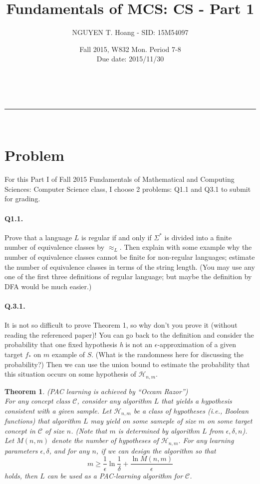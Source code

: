 \documentclass[a4paper,12pt]{article}
\makeatletter
\newcommand{\linia}{\rule{\linewidth}{0.5pt}}
\renewcommand{\maketitle} {
\begin{center}
\vspace{2ex}
{\huge \textsc{\@title}}
\vspace{1ex}
\\
\linia\\
\@author \hfill \@date
\vspace{4ex}
\end{center}
}
\newtheorem{theorem}{Theorem}
\makeatother
\begin{document}

\title{Fundamentals of MCS: CS - Part 1}

\author{NGUYEN T. Hoang - SID: 15M54097}

\date{Fall 2015, W832 Mon. Period 7-8 \\ \hfill Due date: 2015/11/30}

\maketitle

\vfill
\section*{Problem}
\noindent
For this Part I of Fall 2015 Fundamentals of Mathematical and Computing Sciences: Computer Science class, I choose 2 problems: Q1.1 and Q3.1 to submit for grading.

\paragraph{Q1.1.} Prove that a language $L$ is regular if and only if $\Sigma^{*}$ is divided into a finite number of equivalence classes by $\approx_{L}$. Then explain with some example why the number of equivalence classes cannot be finite for non-regular languages; estimate the number of equivalence classes in terms of the string length. (You may use any one of the first three definitions of regular language; but maybe the definition by DFA would be much easier.)

\paragraph{Q.3.1.} It is not so difficult to prove Theorem 1, so why don't you prove it (without reading the referenced paper)! You can go back to the definition and consider the probability that one fixed hypothesis \emph{h} is not an $\epsilon$-approximation of a given target $f_{*}$ on $m$ example of $S$. (What is the randomness here for discussing the probability?) Then we can use the union bound to estimate the probability that this situation occurs on some hypothesis of $\mathcal{H}_{n,m}$.
\begin{theorem}
    (PAC learning is achieved by ``Occam Razor'') \\
    For any concept class $\mathcal{C}$, consider any algorithm $L$ that yields a hypothesis consistent with a given sample. Let $\mathcal{H}_{n,m}$ be a class of hypotheses (i.e., Boolean functions) that algorithm $L$ may yield on some sameple of size $m$ on some target concept in $\mathcal{C}$ of size $n$. (Note that $m$ is determined by algorithm $L$ from $\epsilon, \delta, n$). \\
    Let $M(n,m)$ denote the number of hypotheses of $\mathcal{H}_{n,m}$. For any learning parameters $\epsilon, \delta$, and for any $n$, if we can design the algorithm so that
    \begin{equation*}
        m \geq \frac{1}{\epsilon}\ln{\frac{1}{\delta}} + \frac{\ln{M(n,m)}}{\epsilon}
    \end{equation*}
holds, then $L$ can be used as a PAC-learning algorithm for $\mathcal{C}$.
\end{theorem}
\vfill
\pagebreak
\end{document}
